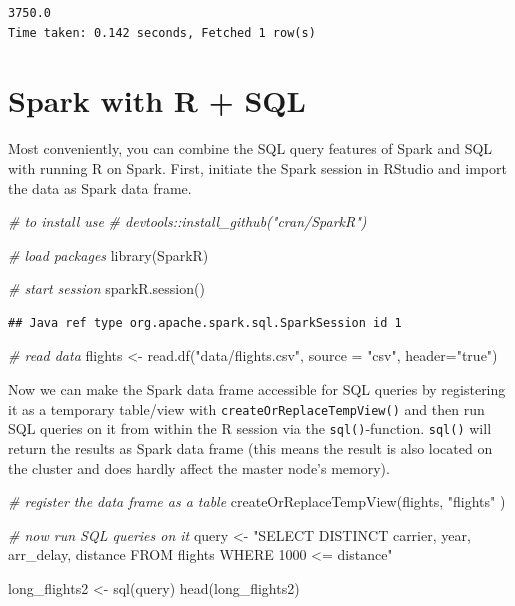 \documentclass[
  12pt,
]{style/krantz}
\newenvironment{Shaded}{\begin{snugshade}}{\end{snugshade}}
\newcommand{\AttributeTok}[1]{\textcolor[rgb]{0.77,0.63,0.00}{#1}}
\newcommand{\CommentTok}[1]{\textcolor[rgb]{0.56,0.35,0.01}{\textit{#1}}}
\newcommand{\FunctionTok}[1]{\textcolor[rgb]{0.00,0.00,0.00}{#1}}
\newcommand{\NormalTok}[1]{#1}
\newcommand{\OtherTok}[1]{\textcolor[rgb]{0.56,0.35,0.01}{#1}}
\newcommand{\StringTok}[1]{\textcolor[rgb]{0.31,0.60,0.02}{#1}}
\begin{document}
\begin{verbatim}
3750.0
Time taken: 0.142 seconds, Fetched 1 row(s)
\end{verbatim}

\hypertarget{spark-with-r-sql}{%
\section{Spark with R + SQL}\label{spark-with-r-sql}}

Most conveniently, you can combine the SQL query features of Spark and SQL with running R on Spark. First, initiate the Spark session in RStudio and import the data as Spark data frame.

\begin{Shaded}
\begin{Highlighting}[]
\CommentTok{\# to install use}
\CommentTok{\# devtools::install\_github("cran/SparkR")}

\CommentTok{\# load packages}
\FunctionTok{library}\NormalTok{(SparkR)}

\CommentTok{\# start session}
\FunctionTok{sparkR.session}\NormalTok{()}
\end{Highlighting}
\end{Shaded}

\begin{verbatim}
## Java ref type org.apache.spark.sql.SparkSession id 1
\end{verbatim}

\begin{Shaded}
\begin{Highlighting}[]
\CommentTok{\# read data }
\NormalTok{flights }\OtherTok{\textless{}{-}} \FunctionTok{read.df}\NormalTok{(}\StringTok{"data/flights.csv"}\NormalTok{, }\AttributeTok{source =} \StringTok{"csv"}\NormalTok{, }\AttributeTok{header=}\StringTok{"true"}\NormalTok{)}
\end{Highlighting}
\end{Shaded}

Now we can make the Spark data frame accessible for SQL queries by registering it as a temporary table/view with \texttt{createOrReplaceTempView()} and then run SQL queries on it from within the R session via the \texttt{sql()}-function. \texttt{sql()} will return the results as Spark data frame (this means the result is also located on the cluster and does hardly affect the master node's memory).

\begin{Shaded}
\begin{Highlighting}[]
\CommentTok{\# register the data frame as a table}
\FunctionTok{createOrReplaceTempView}\NormalTok{(flights, }\StringTok{"flights"}\NormalTok{ )}

\CommentTok{\# now run SQL queries on it}
\NormalTok{query }\OtherTok{\textless{}{-}} 
\StringTok{"SELECT DISTINCT carrier,}
\StringTok{year,}
\StringTok{arr\_delay,}
\StringTok{distance}
\StringTok{FROM flights}
\StringTok{WHERE 1000 \textless{}= distance"}

\NormalTok{long\_flights2 }\OtherTok{\textless{}{-}} \FunctionTok{sql}\NormalTok{(query)}
\FunctionTok{head}\NormalTok{(long\_flights2)}
\end{Highlighting}
\end{Shaded}
\end{document}
